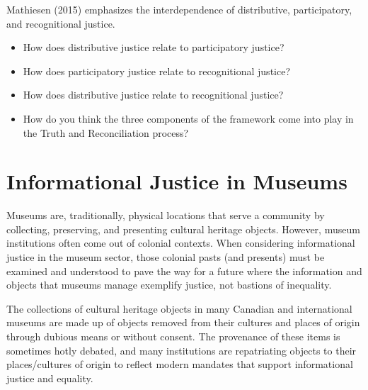 \documentclass[
  letterpaper,
  DIV=11,
  numbers=noendperiod]{scrreprt}
\begin{document}
\begin{tcolorbox}[enhanced jigsaw, arc=.35mm, bottomrule=.15mm, bottomtitle=1mm, breakable, colback=white, colbacktitle=quarto-callout-tip-color!10!white, colframe=quarto-callout-tip-color-frame, coltitle=black, left=2mm, leftrule=.75mm, opacityback=0, opacitybacktitle=0.6, rightrule=.15mm, title=\textcolor{quarto-callout-tip-color}{\faLightbulb}\hspace{0.5em}{Pause and reflect}, titlerule=0mm, toprule=.15mm, toptitle=1mm]

Mathiesen (2015) emphasizes the interdependence of distributive,
participatory, and recognitional justice.

\begin{itemize}
\item
  How does distributive justice relate to participatory justice?
\item
  How does participatory justice relate to recognitional justice?
\item
  How does distributive justice relate to recognitional justice?
\item
  How do you think the three components of the framework come into play
  in the Truth and Reconciliation process?
\end{itemize}

\end{tcolorbox}

\section{Informational Justice in
Museums}\label{informational-justice-in-museums}

Museums are, traditionally, physical locations that serve a community by
collecting, preserving, and presenting cultural heritage objects.
However, museum institutions often come out of colonial contexts. When
considering informational justice in the museum sector, those colonial
pasts (and presents) must be examined and understood to pave the way for
a future where the information and objects that museums manage exemplify
justice, not bastions of inequality.

The collections of cultural heritage objects in many Canadian and
international museums are made up of objects removed from their cultures
and places of origin through dubious means or without consent. The
provenance of these items is sometimes hotly debated, and many
institutions are repatriating objects to their places/cultures of origin
to reflect modern mandates that support informational justice and
equality.
\end{document}
